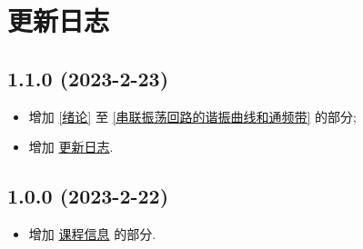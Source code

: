 \documentclass{notes}
\begin{document}
\newpage

\section*{更新日志} \label{更新日志}
\subsection*{1.1.0 (2023-2-23)}
\begin{itemize}
    \item 增加 \ref{绪论} 至 \ref{串联振荡回路的谐振曲线和通频带} 的部分;
    \item 增加 \hyperref[更新日志]{更新日志}.
\end{itemize}

\subsection*{1.0.0 (2023-2-22)}
\begin{itemize}
    \item 增加 \hyperref[课程信息]{课程信息} 的部分.
\end{itemize}
\end{document}
